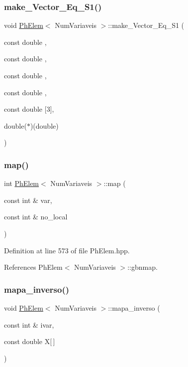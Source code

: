 \subsubsection{\texorpdfstring{make\+\_\+\+Vector\+\_\+\+Eq\+\_\+\+S1()}{make\_Vector\_Eq\_S1()}}
{\footnotesize\ttfamily void \hyperlink{classPhElem}{Ph\+Elem}$<$ Num\+Variaveis $>$\+::make\+\_\+\+Vector\+\_\+\+Eq\+\_\+\+S1 (\begin{DoxyParamCaption}\item[{const double}]{,  }\item[{const double}]{,  }\item[{const double}]{,  }\item[{const double}]{,  }\item[{const double}]{\mbox{[}3\mbox{]},  }\item[{double($\ast$)(double)}]{ }\end{DoxyParamCaption})\hspace{0.3cm}{\ttfamily [inherited]}}

\mbox{\label{classPhElem_a6b7f26c842b4f6b54782c6ddaa4fd6d6}} 
\subsubsection{\texorpdfstring{map()}{map()}}
{\footnotesize\ttfamily int \hyperlink{classPhElem}{Ph\+Elem}$<$ Num\+Variaveis $>$\+::map (\begin{DoxyParamCaption}\item[{const int \&}]{var,  }\item[{const int \&}]{no\+\_\+local }\end{DoxyParamCaption})\hspace{0.3cm}{\ttfamily [inherited]}}



Definition at line 573 of file Ph\+Elem.\+hpp.



References Ph\+Elem$<$ Num\+Variaveis $>$\+::gbnmap.

\mbox{\label{classPhElem_aa53cc9dad058e9dbebfb971bdabe80fc}} 
\subsubsection{\texorpdfstring{mapa\+\_\+inverso()}{mapa\_inverso()}}
{\footnotesize\ttfamily void \hyperlink{classPhElem}{Ph\+Elem}$<$ Num\+Variaveis $>$\+::mapa\+\_\+inverso (\begin{DoxyParamCaption}\item[{const int \&}]{ivar,  }\item[{const double}]{X\mbox{[}$\,$\mbox{]} }\end{DoxyParamCaption})\hspace{0.3cm}{\ttfamily [inherited]}}



